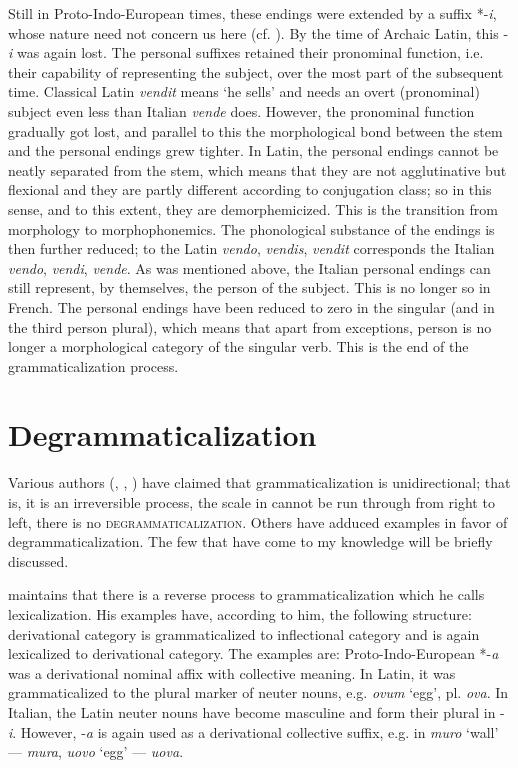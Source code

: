 Still in Proto-Indo-European times, these endings were extended by a suffix *-\textit{i}, whose nature need not concern us here (cf. \pageref{abc}\chk%
). By the time of Archaic Latin, this -\textit{i} was again lost. The personal suffixes retained their pronominal function, i.e. their capability of representing the subject, over the most part of the subsequent time. Classical Latin \textit{vendit} means ‘he sells’ and needs an overt (pronominal) subject even less than Italian \textit{vende} does. However, the pronominal function gradually got lost, and parallel to this the morphological bond between the stem and the personal endings grew tighter. In Latin, the personal endings cannot be neatly separated from the stem, which means that they are not agglutinative but flexional and they are partly different according to conjugation class; so in this sense, and to this extent, they are demorphemicized. This is the transition from morphology to morphophonemics. The phonological substance of the endings is then further reduced; to the Latin \textit{vendo}, \textit{vendis},\textit{ vendit} corresponds the Italian \textit{vendo}, \textit{vendi}, \textit{vende}. As was mentioned above, the Italian personal endings can still represent, by themselves, the person of the subject. This is no longer so in French. The personal endings have been reduced to zero in the singular (and in the third person plural), which means that apart from exceptions, person is no longer a morphological category of the singular verb. This is the end of the grammaticalization process.

\section{Degrammaticalization}

Various authors (\citet[96]{Givón1975}, \citet[103f]{Langacker1977}, \citet[56--60]{Vincent1980b}) have claimed that grammaticalization is unidirectional; that is, it is an irreversible process, the scale in  cannot be run through from right to left, there is no \textsc{degrammaticalization}. Others have adduced examples in favor of degrammaticalization. The few that have come to my knowledge will be briefly discussed.

\citet[52f]{Kuryłowicz1965} maintains that there is a reverse process to grammaticalization which he calls lexicalization. His examples have, according to him, the following structure: derivational category is grammaticalized to inflectional category and is again lexicalized to derivational category. The examples are: Proto-Indo-European *-\textit{a} was a derivational nominal affix with collective meaning. In Latin, it was grammaticalized to the plural marker of neuter nouns, e.g. \textit{ovum} ‘egg’, pl. \textit{ova}. In Italian, the Latin neuter nouns have become masculine and form their plural in -\textit{i}. However, -\textit{a} is again used as a derivational collective suffix, e.g. in \textit{muro} ‘wall’ — \textit{mura}, \textit{uovo} ‘egg’ — \textit{uova}.


